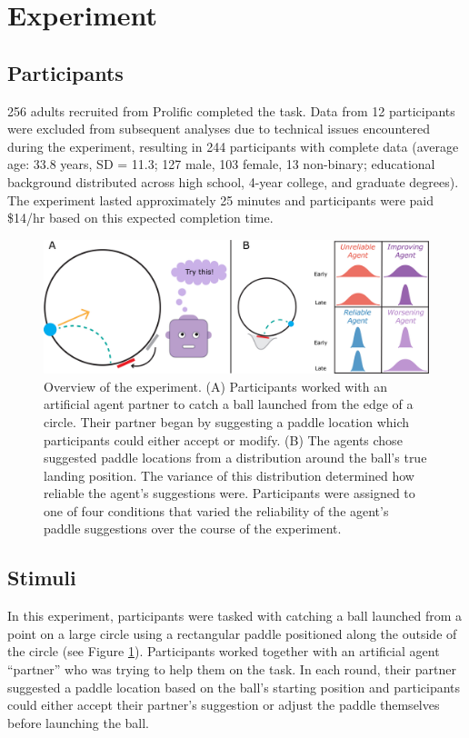 \documentclass[10pt,letterpaper]{article}
\begin{document}
\section{Experiment}

\subsection{Participants}

256 adults recruited from Prolific completed the task. Data from 12 participants were excluded from subsequent analyses due to technical issues encountered during the experiment, resulting in 244 participants with complete data (average age: 33.8 years, SD = 11.3; 127 male, 103 female, 13 non-binary; educational background distributed across high school, 4-year college, and graduate degrees). The experiment lasted approximately 25 minutes and participants were paid \$14/hr based on this expected completion time. 



\begin{figure}[hbtp]
\vspace{-8mm}
\includegraphics[width=\textwidth]{img/expt_overview.jpg} 
\vspace{-4mm}
\caption{Overview of the experiment. (A) Participants worked with an artificial agent partner to catch a ball launched from the edge of a circle. Their partner began by suggesting a paddle location which participants could either accept or modify. (B) The agents chose suggested paddle locations from a distribution around the ball's true landing position. The variance of this distribution determined how reliable the agent's suggestions were. Participants were assigned to one of four conditions that varied the reliability of the agent's paddle suggestions over the course of the experiment.} 
\label{fig:stimuli}
\end{figure}




\subsection{Stimuli}
In this experiment, participants were tasked with catching a ball launched from a point on a large circle using a rectangular paddle positioned along the outside of the circle (see Figure \ref{fig:stimuli}).\footnotemark{} 
Participants worked together with an artificial agent ``partner'' who was trying to help them on the task. In each round, their partner suggested a paddle location based on the ball's starting position and participants could either accept their partner's suggestion or adjust the paddle themselves before launching the ball.
\end{document}

